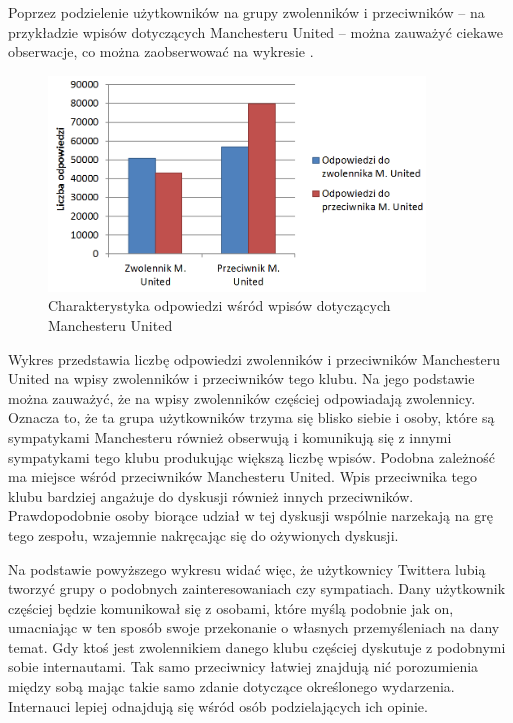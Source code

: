 Poprzez podzielenie użytkowników na grupy zwolenników i przeciwników -- na
przykładzie wpisów dotyczących Manchesteru United -- można zauważyć ciekawe
obserwacje, co można zaobserwować na wykresie .

\begin{figure}[ht!]
\centering
\includegraphics[width=100mm]{img/replies-munited.png}
\caption{Charakterystyka odpowiedzi wśród wpisów dotyczących Manchesteru United}
\label{image:replies-munited}
\end{figure}

Wykres przedstawia liczbę odpowiedzi zwolenników i przeciwników Manchesteru 
United na wpisy zwolenników i przeciwników tego klubu. Na jego podstawie można
zauważyć, że na wpisy zwolenników częściej odpowiadają zwolennicy. 
Oznacza to, że ta grupa użytkowników trzyma się blisko siebie i osoby, które
są sympatykami Manchesteru również obserwują i komunikują się z innymi 
sympatykami tego klubu produkując większą liczbę wpisów.
Podobna zależność ma miejsce wśród przeciwników Manchesteru United.
Wpis przeciwnika tego klubu bardziej angażuje do dyskusji również innych
przeciwników. Prawdopodobnie osoby biorące udział w tej dyskusji wspólnie
narzekają na grę tego zespołu, wzajemnie nakręcając się do ożywionych dyskusji.

Na podstawie powyższego wykresu widać więc, że użytkownicy Twittera lubią 
tworzyć grupy o podobnych zainteresowaniach czy sympatiach. Dany użytkownik
częściej będzie komunikował się z osobami, które myślą podobnie jak on,
umacniając w ten sposób swoje przekonanie o własnych przemyśleniach na dany temat.
Gdy ktoś jest zwolennikiem danego klubu częściej dyskutuje z podobnymi sobie
internautami. Tak samo przeciwnicy łatwiej znajdują nić porozumienia między sobą
mając takie samo zdanie dotyczące określonego wydarzenia. Internauci lepiej
odnajdują się wśród osób podzielających ich opinie.  









